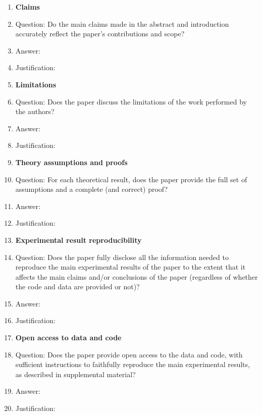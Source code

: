 \documentclass{article}
\begin{document}
\begin{enumerate}

\item {\bf Claims}
    \item[] Question: Do the main claims made in the abstract and introduction accurately reflect the paper's contributions and scope?
    \item[] Answer: \answerTODO{} %
    \item[] Justification: \justificationTODO{} %

\item {\bf Limitations}
    \item[] Question: Does the paper discuss the limitations of the work performed by the authors?
    \item[] Answer: \answerTODO{} %
    \item[] Justification: \justificationTODO{}

\item {\bf Theory assumptions and proofs}
    \item[] Question: For each theoretical result, does the paper provide the full set of assumptions and a complete (and correct) proof?
    \item[] Answer: \answerTODO{} %
    \item[] Justification: \justificationTODO{}

    \item {\bf Experimental result reproducibility}
    \item[] Question: Does the paper fully disclose all the information needed to reproduce the main experimental results of the paper to the extent that it affects the main claims and/or conclusions of the paper (regardless of whether the code and data are provided or not)?
    \item[] Answer: \answerTODO{} %
    \item[] Justification: \justificationTODO{}

\item {\bf Open access to data and code}
    \item[] Question: Does the paper provide open access to the data and code, with sufficient instructions to faithfully reproduce the main experimental results, as described in supplemental material?
    \item[] Answer: \answerTODO{} %
    \item[] Justification: \justificationTODO{}


\end{enumerate}
\end{document}
